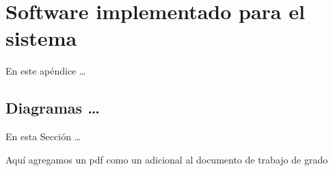 \chapter{Software implementado para el sistema}
En este apéndice \ldots

\section{Diagramas \ldots}
En esta Sección \ldots

Aquí agregamos un pdf como un adicional al documento de trabajo de grado


















